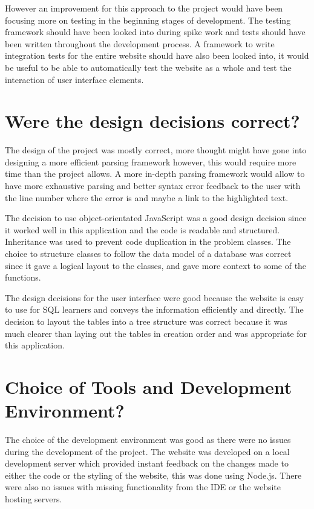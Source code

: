 However an improvement for this approach to the project would have been focusing more on testing in the beginning stages of development. The testing framework should have been looked into during spike work and tests should have been written throughout the development process. A framework to write integration tests for the entire website should have also been looked into, it would be useful to be able to automatically test the website as a whole and test the interaction of user interface elements.

\section{Were the design decisions correct?}

The design of the project was mostly correct, more thought might have gone into designing a more efficient parsing framework however, this would require more time than the project allows. A more in-depth parsing framework would allow to have more exhaustive parsing and better syntax error feedback to the user with the line number where the error is and maybe a link to the highlighted text.

The decision to use object-orientated JavaScript was a good design decision since it worked well in this application and the code is readable and structured. Inheritance was used to prevent code duplication in the problem classes. The choice to structure classes to follow the data model of a database was correct since it gave a logical layout to the classes, and gave more context to some of the functions.

The design decisions for the user interface were good because the website is easy to use for SQL learners and conveys the information efficiently and directly. The decision to layout the tables into a tree structure was correct because it was much clearer than laying out the tables in creation order and was appropriate for this application.

\section{Choice of Tools and Development Environment?}

The choice of the development environment was good as there were no issues during the development of the project. The website was developed on a local development server which provided instant feedback on the changes made to either the code or the styling of the website, this was done using Node.js. There were also no issues with missing functionality from the IDE or the website hosting servers. 

